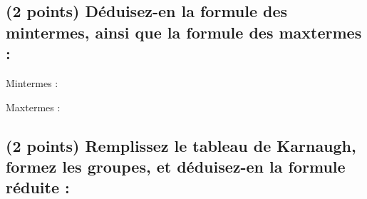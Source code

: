 \documentclass[11pt,a4paper]{article}
\begin{document}
\begin{table}[!ht]
\begin{minipage}{0.50\textwidth}

\subsection{(2 points) Déduisez-en la formule des mintermes, ainsi que la formule des maxtermes : }

\bigskip

Mintermes :

\vspace*{3.35cm}


\bigskip

Maxtermes :

\vspace*{3.35cm}


  \end{minipage}
\end{table}


\vspace*{-0.25cm}


\subsection{(2 points) Remplissez le tableau de Karnaugh, formez les groupes, et déduisez-en la formule réduite : }
\end{document}
